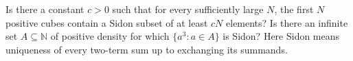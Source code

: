 Is there a constant $c>0$ such that for every sufficiently large $N$, the first $N$ positive cubes contain a Sidon subset of at least $cN$ elements? Is there an infinite set $A\subseteq\mathbb N$ of positive density for which $\{a^3:a\in A\}$ is Sidon? Here Sidon means uniqueness of every two-term sum up to exchanging its summands.
